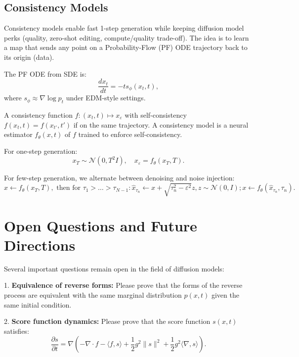 \subsection{Consistency Models}

Consistency models enable fast 1-step generation while keeping diffusion model perks (quality, zero-shot editing, compute/quality trade-off). The idea is to learn a map that sends any point on a Probability-Flow (PF) ODE trajectory back to its origin (data).

The PF ODE from SDE is:
\begin{equation}
\frac{dx_t}{dt} = -t s_\phi(x_t,t),
\end{equation}
where $s_\phi \approx \nabla \log p_t$ under EDM-style settings.

A consistency function $f:(x_t,t) \mapsto x_\varepsilon$ with self-consistency $f(x_t,t) = f(x_{t'},t')$ if on the same trajectory. A consistency model is a neural estimator $f_\theta(x,t)$ of $f$ trained to enforce self-consistency.

For one-step generation:
\begin{equation}
x_T \sim \mathcal{N}(0,T^2 I), \quad x_\varepsilon = f_\theta(x_T,T).
\end{equation}

For few-step generation, we alternate between denoising and noise injection:
\begin{equation}
x \leftarrow f_\theta(x_T,T), \text{ then for } \tau_1 > \ldots > \tau_{N-1}: \hat{x}_{\tau_n} \leftarrow x + \sqrt{\tau_n^2-\varepsilon^2} z, z \sim \mathcal{N}(0,I); x \leftarrow f_\theta(\hat{x}_{\tau_n},\tau_n).
\end{equation}

\section{Open Questions and Future Directions}

Several important questions remain open in the field of diffusion models:

1. \textbf{Equivalence of reverse forms:} Please prove that the forms of the reverse process are equivalent with the same marginal distribution $p(x,t)$ given the same initial condition.

2. \textbf{Score function dynamics:} Please prove that the score function $s(x,t)$ satisfies:
\begin{equation}
\frac{\partial s}{\partial t} = \nabla \left(-\nabla \cdot f - \langle f, s\rangle + \frac{1}{2}g^2\|s\|^2 + \frac{1}{2}g^2\langle \nabla, s \rangle\right).
\end{equation}

